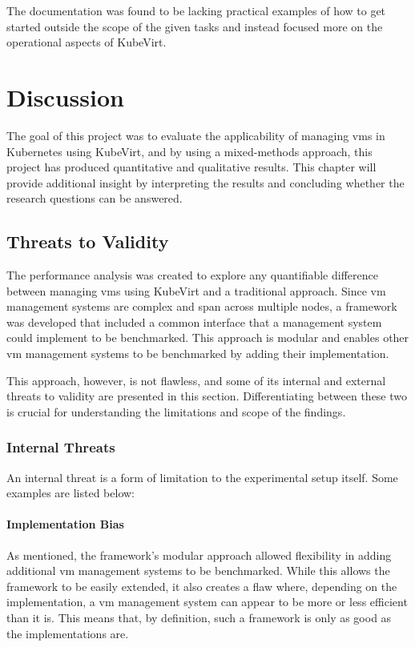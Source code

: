 \documentclass{kththesis}
\begin{document}
\begin{enumerate}
The documentation was found to be lacking practical examples of how to get started outside the scope of the given tasks and instead focused more on the operational aspects of KubeVirt. 

\chapter{Discussion}
The goal of this project was to evaluate the applicability of managing \Glspl{vm} in Kubernetes using KubeVirt, and by using a mixed-methods approach, this project has produced quantitative and qualitative results. This chapter will provide additional insight by interpreting the results and concluding whether the research questions can be answered. 

\section{Threats to Validity}
\label{result-intepretation}
The performance analysis was created to explore any quantifiable difference between managing \Glspl{vm} using KubeVirt and a traditional approach. Since \Gls{vm} management systems are complex and span across multiple nodes, a framework was developed that included a common interface that a management system could implement to be benchmarked. This approach is modular and enables other \Gls{vm} management systems to be benchmarked by adding their implementation.

This approach, however, is not flawless, and some of its internal and external threats to validity are presented in this section. Differentiating between these two is crucial for understanding the limitations and scope of the findings. 

\subsection{Internal Threats}
An internal threat is a form of limitation to the experimental setup itself. Some examples are listed below:

\subsubsection{Implementation Bias}
As mentioned, the framework's modular approach allowed flexibility in adding additional \Gls{vm} management systems to be benchmarked. While this allows the framework to be easily extended, it also creates a flaw where, depending on the implementation, a \Gls{vm} management system can appear to be more or less efficient than it is. This means that, by definition, such a framework is only as good as the implementations are.


\end{enumerate}
\end{document}
